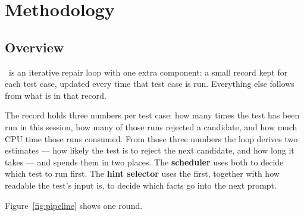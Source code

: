 \chapter{Methodology}
\label{ch:method}

\section{Overview}
\label{sec:method-overview}

\caster\ is an iterative repair loop with one extra component: a small record
kept for each test case, updated every time that test case is run. Everything
else follows from what is in that record.

The record holds three numbers per test case: how many times the test has been
run in this session, how many of those runs rejected a candidate, and how much
CPU time those runs consumed. From those three numbers the loop derives two
estimates --- how likely the test is to reject the next candidate, and how long
it takes --- and spends them in two places. The \textbf{scheduler} uses both to
decide which test to run first. The \textbf{hint selector} uses the first,
together with how readable the test's input is, to decide which facts go into
the next prompt.

Figure~\ref{fig:pipeline} shows one round.

